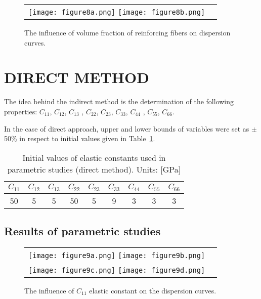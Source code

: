 \documentclass[]{spie}  %
\begin{document}
\begin{figure} [ht]
	\begin{center}
		\begin{tabular}{cc} %
			\texttt{[image: figure8a.png]}
			\texttt{[image: figure8b.png]}
		\end{tabular}
	\end{center}
	\caption[] 
	{ \label{fig:vol} 
		The influence of volume fraction of reinforcing fibers on dispersion curves.}
\end{figure} 

\clearpage
\section{DIRECT METHOD}
\label{sec:direct}
The idea behind the indirect method is the determination of the following properties:
\(C_{11}\), \(C_{12}\), \(C_{13}\) , \(C_{22}\), \(C_{23}\), \(C_{33}\), \(C_{44}\) , \(C_{55}\), 
\(C_{66}\).

In the case of direct approach, upper and lower bounds of variables were set as  
\(\pm\)50\% in respect to initial values given in Table~\ref{tab:Ctensor_initial}.
\begin{table}[h!]
	\renewcommand{\arraystretch}{1.3}
	\caption{Initial values of elastic constants used in parametric studies (direct method). 
	Units: [GPa]}
		\label{tab:Ctensor_initial}
	\begin{center}
		\begin{tabular}{ccccccccc} 
			\toprule
			\(C_{11}\) & \(C_{12}\) & \(C_{13}\)  & \(C_{22}\) & \(C_{23}\) & \(C_{33}\) & 
			\(C_{44}\)  & \(C_{55}\) & \(C_{66}\) \\
			\midrule
			50 &5& 5&  50 & 5 & 9 & 3 & 3 & 3\\
			\bottomrule 
		\end{tabular} 
	\end{center}
\end{table}

\subsection{Results of parametric studies}


\begin{figure} [ht]
	\begin{center}
		\begin{tabular}{cc} %
			\texttt{[image: figure9a.png]}
			\texttt{[image: figure9b.png]}\\
			\texttt{[image: figure9c.png]}
			\texttt{[image: figure9d.png]}
		\end{tabular}
	\end{center}
	\caption[] 
	{ \label{fig:C11} 
		The influence of \(C_{11}\) elastic constant on the dispersion curves.}
\end{figure} 
\end{document}

